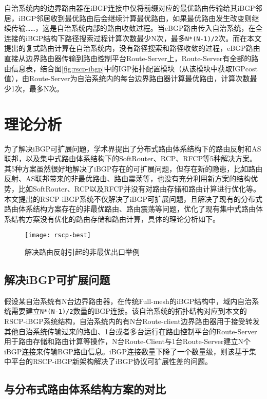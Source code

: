 自治系统内的边界路由器在iBGP连接中仅将前缀对应的最优路由传输给其iBGP邻居，iBGP邻居收到最优路由后会继续计算最优路由，如果最优路由发生改变则继续传输……，这是自治系统内部的路由收敛过程。当eBGP路由传入自治系统，在全连接的iBGP结构下路径搜索过程计算次数最少N次，最多\verb+N*(N-1)/2+次。而在本文提出的复式路由计算在自治系统内，没有路径搜索和路径收敛的过程，eBGP路由直接从边界路由器传输到路由控制平台Route-Server上，Route-Server有全部的路由信息表，结合图\ref{fig:rscp-ibgp}中的IGP拓扑配置模块（从该模块中获取IGPcost值），由Route-Server为自治系统内的每台边界路由器计算最优路由，计算次数最少1次，最多N次。

\section{理论分析}

为了解决iBGP可扩展问题，学术界提出了分布式路由体系结构下的路由反射和AS联邦，以及集中式路由体系结构下的SoftRouter、RCP、RFCP等5种解决方案。其5种方案虽然很好地解决了iBGP存在的可扩展问题，但存在新的隐患，比如路由反射、AS联邦带来的非最优路由、路由震荡等，也没有充分利用新方案的结构优势，比如SoftRouter、RCP以及RFCP并没有对路由存储和路由计算进行优化等。本文提出的RSCP-iBGP系统不仅解决了iBGP可扩展问题，且解决了现有的分布式路由体系结构方案存在的非最优路由、路由震荡等问题，优化了现有集中式路由体系结构方案没有优化的路由存储和路由计算，具体的理论分析如下。

\begin{figure}
  \centering
  \texttt{[image: rscp-best]}
  \caption{解决路由反射引起的非最优出口举例}
  \label{fig:rscp-best}
\end{figure}


\subsection{解决iBGP可扩展问题}
假设某自治系统有N台边界路由器，在传统Full-mesh的iBGP结构中，域内自治系统需要建立\verb+N*(N-1)/2+数量的BGP连接。该自治系统的拓扑结构对应到本文的RSCP-iBGP系统结构，自治系统内的有N台Route-client边界路由器用于接受转发其他自治系统传输过来的路由、1台或者多台运行在路由控制平台的Route-Server用于路由存储和路由计算等操作，N台Route-Client与1台Route-Server建立N个iBGP连接来传输BGP路由信息。iBGP连接数量下降了一个数量级，则该基于集中平台的RSCP-iBGP新架构解决了iBGP协议可扩展性差的问题。

\subsection{与分布式路由体系结构方案的对比}

